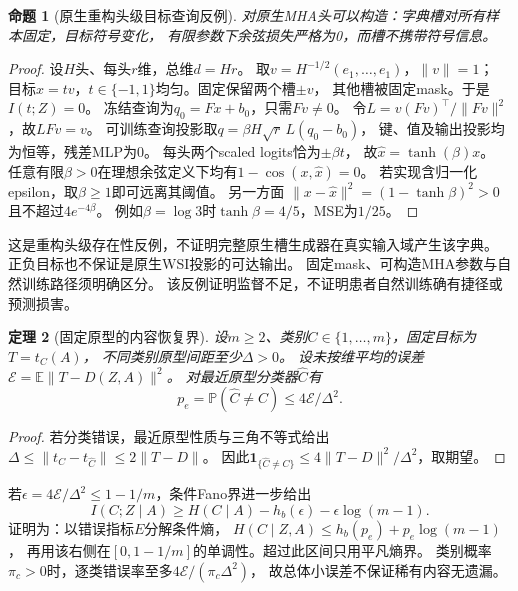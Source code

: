 \documentclass[UTF8,fontset=fandol,11pt,a4paper]{ctexart}
\newtheorem{theorem}{定理}[section]
\newtheorem{proposition}[theorem]{命题}
\theoremstyle{remark}
\newcommand{\E}{\mathbb E}
\newcommand{\Prob}{\mathbb P}
\newcommand{\ind}{\mathbf 1}
\begin{document}
\begin{proposition}[原生重构头级目标查询反例]\label{pr:query}
对原生MHA头可以构造：字典槽对所有样本固定，目标符号变化，
有限参数下余弦损失严格为0，而槽不携带符号信息。
\end{proposition}
\begin{proof}
设$H$头、每头$r$维，总维$d=Hr$。
取$v=H^{-1/2}(e_1,\ldots,e_1)$，$\|v\|=1$；
目标$x=tv$，$t\in\{-1,1\}$均匀。固定保留两个槽$\pm v$，
其他槽被固定mask。于是$I(t;Z)=0$。
冻结查询为$q_0=Fx+b_0$，只需$Fv\ne0$。
令$L=v(Fv)^\top/\|Fv\|^2$，故$LFv=v$。
可训练查询投影取$q=\beta H\sqrt r\,L(q_0-b_0)$，
键、值及输出投影均为恒等，残差MLP为0。
每头两个scaled logits恰为$\pm\beta t$，
故$\widehat x=\tanh(\beta)x$。
任意有限$\beta>0$在理想余弦定义下均有$1-\cos(x,\widehat x)=0$。
若实现含归一化epsilon，取$\beta\ge1$即可远离其阈值。
另一方面
$\|x-\widehat x\|^2=(1-\tanh\beta)^2>0$且不超过$4e^{-4\beta}$。
例如$\beta=\log3$时$\tanh\beta=4/5$，MSE为$1/25$。
\end{proof}
这是重构头级存在性反例，不证明完整原生槽生成器在真实输入域产生该字典。
正负目标也不保证是原生WSI投影的可达输出。
固定mask、可构造MHA参数与自然训练路径须明确区分。
该反例证明监督不足，不证明患者自然训练确有捷径或预测损害。

\begin{theorem}[固定原型的内容恢复界]\label{th:recovery}
设$m\ge2$、类别$C\in\{1,\ldots,m\}$，固定目标为$T=t_C(A)$，
不同类别原型间距至少$\Delta>0$。
设未按维平均的误差$\mathcal E=\E\|T-D(Z,A)\|^2$。
对最近原型分类器$\widehat C$有
\[
 p_e=\Prob(\widehat C\ne C)\le4\mathcal E/\Delta^2.
\]
\end{theorem}
\begin{proof}
若分类错误，最近原型性质与三角不等式给出
$\Delta\le\|t_C-t_{\widehat C}\|\le2\|T-D\|$。
因此$\ind_{\{\widehat C\ne C\}}\le4\|T-D\|^2/\Delta^2$，取期望。
\end{proof}
若$\epsilon=4\mathcal E/\Delta^2\le1-1/m$，条件Fano界进一步给出
\[
 I(C;Z\mid A)\ge H(C\mid A)-h_b(\epsilon)-\epsilon\log(m-1).
\]
证明为：以错误指标$E$分解条件熵，
$H(C\mid Z,A)\le h_b(p_e)+p_e\log(m-1)$，
再用该右侧在$[0,1-1/m]$的单调性。超过此区间只用平凡熵界。
类别概率$\pi_c>0$时，逐类错误率至多$4\mathcal E/(\pi_c\Delta^2)$，
故总体小误差不保证稀有内容无遗漏。
\end{document}
